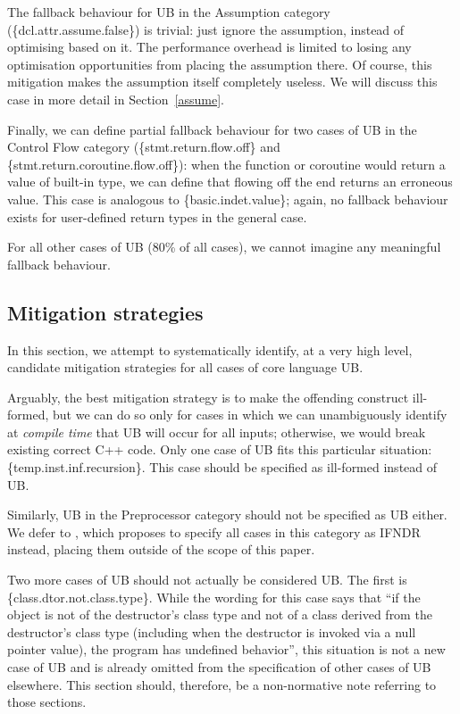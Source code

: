 The fallback behaviour for UB in the Assumption category (\{dcl.attr.assume.false\}) is trivial: just ignore the assumption, instead of optimising based on it. The performance overhead is limited to losing any optimisation opportunities from placing the assumption there. Of course, this mitigation makes the assumption itself completely useless. We will discuss this case in more detail in Section~\ref{assume}.

Finally, we can define partial fallback behaviour for two cases of UB in the Control Flow category  (\{stmt.return.flow.off\} and \{stmt.return.coroutine.flow.off\}): when the function or coroutine would return a value of built-in type, we can define that flowing off the end returns an erroneous value. This case is analogous to \{basic.indet.value\}; again, no fallback behaviour exists for user-defined return types in the general case.

For all other cases of UB (80\% of all cases), we cannot imagine any meaningful fallback behaviour.

\subsection{Mitigation strategies}
\label{mitigation}

In this section, we attempt to systematically identify, at a very high level, candidate mitigation strategies for all cases of core language UB.

Arguably, the best mitigation strategy is to make the offending construct ill-formed, but we can do so only for cases in which we can unambiguously identify at \emph{compile time} that UB will occur for all inputs; otherwise, we would break existing correct C++ code. Only one case of UB fits this particular situation: 
\{temp.inst.inf.recursion\}. This case should be specified as ill-formed instead of UB.

Similarly, UB in the Preprocessor category should not be specified as UB either. We defer to \cite{P2843R2}, which proposes to specify all cases in this category as IFNDR instead, placing them outside of the scope of this paper.

Two more cases of UB should not actually be considered UB. The first is \{class.dtor.not.class.type\}. While the wording for this case says that ``if the object is not of the destructor's class type and not of a class derived from the destructor's class type (including when the destructor is invoked via a null pointer value), the program has undefined behavior'',
this situation is not a new case of UB and is already omitted from the specification of other cases of UB elsewhere. This section should, therefore, be a non-normative note referring to those sections.

